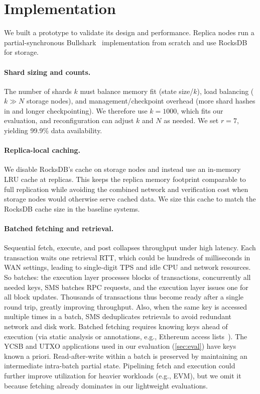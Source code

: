\section{Implementation}
\label{sec:impl}

We built a \sys prototype to validate its design and performance.
Replica nodes run a partial-synchronous Bullshark~\cite{spiegelman2022bullshark} implementation from scratch and use RocksDB for storage.

\paragraph{Shard sizing and counts.}
The number of shards $k$ must balance memory fit (state size/$k$), load balancing ($k \gg N$ storage nodes), and management/checkpoint overhead (more shard hashes in \votec and longer checkpointing).
We therefore use $k=1000$, which fits our evaluation, and reconfiguration can adjust $k$ and $N$ as needed.
We set $r=7$, yielding 99.9\% data availability.

\paragraph{Replica-local caching.}
We disable RocksDB’s cache on storage nodes and instead use an in-memory LRU cache at replicas.
This keeps the replica memory footprint comparable to full replication while avoiding the combined network and verification cost when storage nodes would otherwise serve cached data.
We size this cache to match the RocksDB cache size in the baseline systems.

\paragraph{Batched fetching and retrieval.}
Sequential fetch, execute, and post collapses throughput under high latency. Each transaction waits one retrieval RTT, which could be hundreds of milliseconds in WAN settings, leading to single-digit TPS and idle CPU and network resources.
So \sys batches: the execution layer processes blocks of transactions, concurrently \fetch all needed keys, SMS batches \retrieve RPC requests, and the execution layer issues one \bump for all block updates.
Thousands of transactions thus become ready after a single round trip, greatly improving throughput.
Also, when the same key is accessed multiple times in a batch, SMS deduplicates retrievals to avoid redundant network and disk work.
Batched fetching requires knowing keys ahead of execution (via static analysis or annotations, e.g., Ethereum access lists~\cite{heimbach2024dissecting}).
The YCSB and UTXO applications used in our evaluation (\cref{sec:eval}) have keys known a priori.
Read-after-write within a batch is preserved by maintaining an intermediate intra-batch partial state.
Pipelining fetch and execution could further improve utilization for heavier workloads (e.g., EVM), but we omit it because fetching already dominates in our lightweight evaluations.

